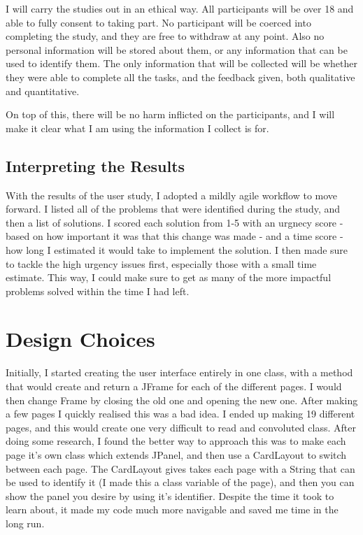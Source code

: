 I will carry the studies out in an ethical way. All participants will be over 18 and able to fully consent to taking part. No participant will be coerced into completing the study, and they are free to withdraw at any point. Also no personal information will be stored about them, or any information that can be used to identify them. The only information that will be collected will be whether they were able to complete all the tasks, and the feedback given, both qualitative and quantitative.

On top of this, there will be no harm inflicted on the participants, and I will make it clear what I am using the information I collect is for. 

\subsection{Interpreting the Results}

With the results of the user study, I adopted a mildly agile workflow to move forward. I listed all of the problems that were identified during the study, and then a list of solutions. I scored each solution from 1-5 with an urgnecy score - based on how important it was that this change was made - and a time score - how long I estimated it would take to implement the solution. I then made sure to tackle the high urgency issues first, especially those with a small time estimate. This way, I could make sure to get as many of the more impactful problems solved within the time I had left. 


\section{Design Choices}
Initially, I started creating the user interface entirely in one class, with a method that would create and return a JFrame for each of the different pages. I would then change Frame by closing the old one and opening the new one. After making a few pages I quickly realised this was a bad idea. I ended up making 19 different pages, and this would create one very difficult to read and convoluted class. After doing some research\cite{cardLayout}, I found the better way to approach this was to make each page it's own class which extends JPanel, and then use a CardLayout to switch between each page. The CardLayout gives takes each page with a String that can be used to identify it (I made this a class variable of the page), and then you can show the panel you desire by using it's identifier. Despite the time it took to learn about, it made my code much more navigable and saved me time in the long run.

